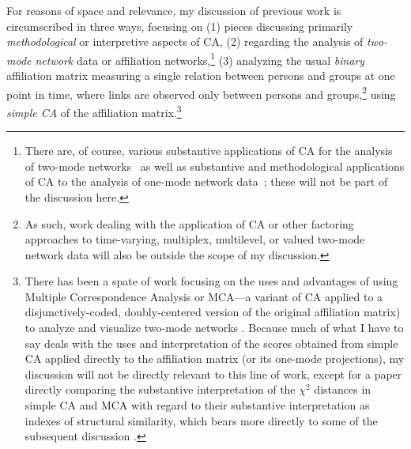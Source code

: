 \documentclass[a4paper,fleqn]{cas-sc}
\begin{document}
For reasons of space and relevance, my discussion of previous work is circumscribed in three ways, focusing on (1) pieces discussing primarily \textit{methodological} or interpretive aspects of CA, (2) regarding the analysis of \textit{two-mode network} data or affiliation networks,\footnote{There are, of course, various substantive applications of CA for the analysis of two-mode networks~\citep[e.g.,][]{breiger2000tool, faust2002scaling, schweizer1991power, serino2024mapping, ragozini2018analysis} as well as substantive and methodological applications of CA to the analysis of one-mode network data~\citep[e.g.,][]{noma1985scaling, kumbasar1994systematic, lizardo2020correspondence}; these will not be part of the discussion here.} (3) analyzing the usual \textit{binary} affiliation matrix measuring a single relation between persons and groups at one point in time, where links are observed only between persons and groups,\footnote{As such, work dealing with the application of CA or other factoring approaches to time-varying, multiplex, multilevel, or valued two-mode network data \citep{ragozini2014correspondence, ragozini2015multiple, zhu2016correspondence} will also be outside the scope of my discussion.} using \textit{simple CA} of the affiliation matrix.\footnote{There has been a spate of work focusing on the uses and advantages of using Multiple Correspondence Analysis or MCA---a variant of CA applied to a disjunctively-coded, doubly-centered version of the original affiliation matrix) to analyze and visualize two-mode networks \citep[e.g.,][]{dramalidis2016subset, desposito2014use, ragozini2014correspondence}. Because much of what I have to say deals with the uses and interpretation of the scores obtained from simple CA applied directly to the affiliation matrix (or its one-mode projections), my discussion will not be directly relevant to this line of work, except for a paper directly comparing the substantive interpretation of the $\chi^2$ distances in simple CA and MCA with regard to their substantive interpretation as indexes of structural similarity, which bears more directly to some of the subsequent discussion \citep{desposito2014comparison}.}
\end{document}
